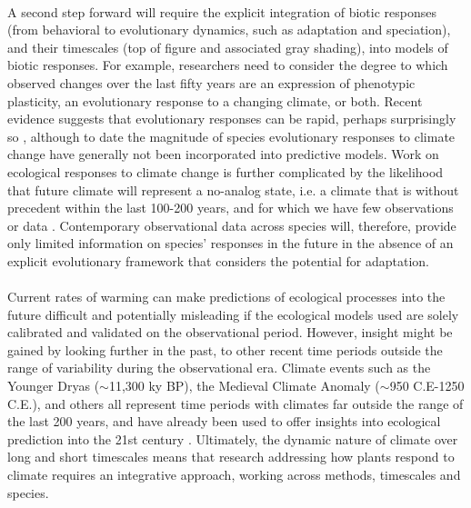 \documentclass[11pt,a4paper]{article}
\begin{document}
\\
A second step forward will require the explicit integration of biotic responses (from behavioral to evolutionary dynamics, such as adaptation and speciation), and their timescales (top of figure and associated gray shading), into models of biotic responses. For example, researchers need to consider the degree to which observed changes over the last fifty years are an expression of phenotypic plasticity, an evolutionary response to a changing climate, or both. Recent evidence suggests that evolutionary responses can be rapid, perhaps surprisingly so \citep{schoener2011}, although to date the magnitude of species evolutionary responses to climate change have generally not been incorporated into predictive models. Work on ecological responses to climate change is further complicated by the likelihood that future climate will represent a no-analog state, i.e. a climate that is without precedent within the last 100-200 years, and for which we have few observations or data \citep{veloz2012}. Contemporary observational data across species will, therefore, provide only limited information on species' responses in the future in the absence of an explicit evolutionary framework that considers the potential for adaptation.  \\
\\
Current rates of warming can make predictions of ecological processes into the future difficult and potentially misleading if the ecological models used are solely calibrated and validated on the observational period. However, insight might be gained by looking further in the past, to other recent time periods outside the range of variability during the observational era. Climate events such as the Younger Dryas (\(\sim\)11,300 ky BP), the Medieval Climate Anomaly (\(\sim\)950 C.E-1250 C.E.), and others all represent time periods with climates far outside the range of the last 200 years, and have already been used to offer insights into ecological prediction into the 21st century \citep{veloz2012}. Ultimately, the dynamic nature of climate over long and short timescales means that research addressing how plants respond to climate requires an integrative approach, working across methods, timescales and species. \\
\end{document}

